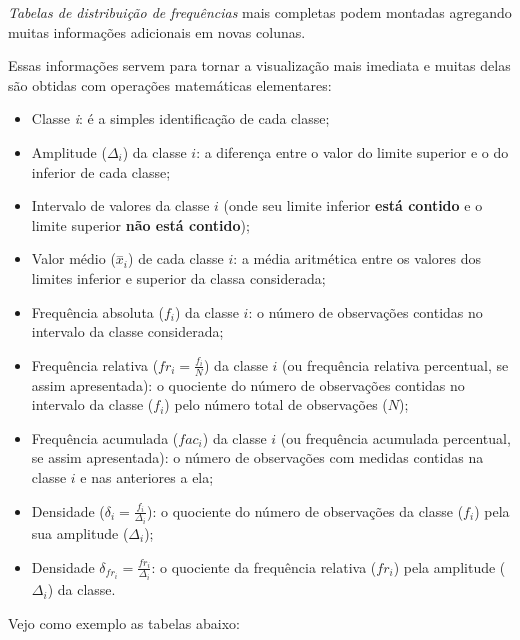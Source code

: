 \documentclass[
]{book}
\providecommand{\tightlist}{%
  \setlength{\itemsep}{0pt}\setlength{\parskip}{0pt}}
\begin{document}
\hfill\break

\emph{Tabelas de distribuição de frequências} mais completas podem montadas agregando muitas informações adicionais em novas colunas.

Essas informações servem para tornar a visualização mais imediata e muitas delas são obtidas com operações matemáticas elementares:

\hfill\break

\begin{itemize}
\tightlist
\item
  Classe \emph{i}: é a simples identificação de cada classe;
\item
  Amplitude (\(\Delta_{i}\)) da classe \(i\): a diferença entre o valor do limite superior e o do inferior de cada classe;
\item
  Intervalo de valores da classe \(i\) (onde seu limite inferior \textbf{está contido} e o limite superior \textbf{não está contido});
\item
  Valor médio (\(\stackrel{-}{x}_{i}\)) de cada classe \(i\): a média aritmética entre os valores dos limites inferior e superior da classa considerada;
\item
  Frequência absoluta (\(f_{i}\)) da classe \(i\): o número de observações contidas no intervalo da classe considerada;
\item
  Frequência relativa (\(fr_{i}= \frac{f_{i}}{N}\)) da classe \(i\) (ou frequência relativa percentual, se assim apresentada): o quociente do número de observações contidas no intervalo da classe (\(f_{i}\)) pelo número total de observações (\(N\));
\item
  Frequência acumulada (\(fac_{i}\)) da classe \(i\) (ou frequência acumulada percentual, se assim apresentada): o número de observações com medidas contidas na classe \(i\) e nas anteriores a ela;
\item
  Densidade (\(\delta_{i}=\frac{f_{i}}{\Delta_{i}}\)): o quociente do número de observações da classe (\(f_{i}\)) pela sua amplitude (\(\Delta_{i}\));
\item
  Densidade \(\delta_{fr_{i}}=\frac{fr_{i}}{\Delta_{i}}\): o quociente da frequência relativa (\(fr_{i}\)) pela amplitude (\(\Delta_{i}\)) da classe.
\end{itemize}

\hfill\break

Vejo como exemplo as tabelas abaixo:

\hfill\break
\end{document}
